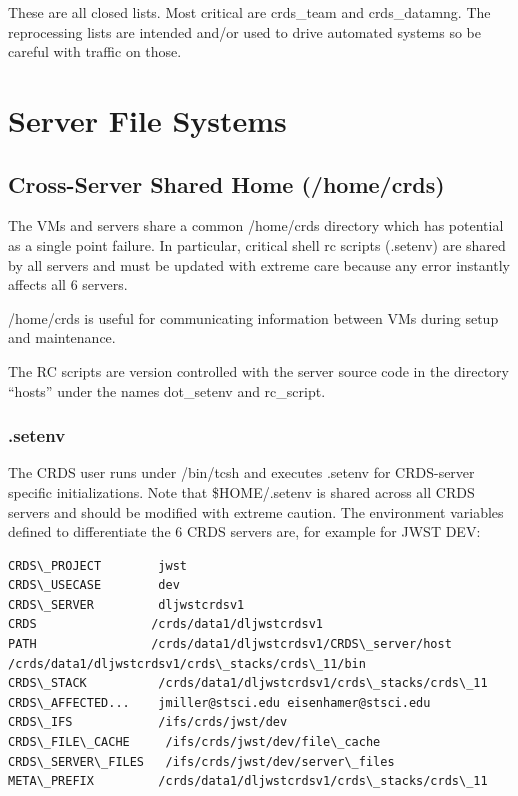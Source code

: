 \documentclass[letterpaper,10pt,english]{sphinxmanual}
\begin{document}
These are all closed lists.  Most critical are crds\_team and crds\_datamng.   The reprocessing lists are intended and/or used to drive
automated systems so be careful with traffic on those.


\chapter{Server File Systems}
\label{server_guide:server-file-systems}

\section{Cross-Server Shared Home (/home/crds)}
\label{server_guide:cross-server-shared-home-home-crds}
The VMs and servers share a common /home/crds directory which has potential as a single point failure.  In particular,
critical shell rc scripts (.setenv) are shared by all servers and must be updated with extreme care because
any error instantly affects all 6 servers.

/home/crds is useful for communicating information between VMs during setup and maintenance.

The RC scripts are version controlled with the server source code in the directory ``hosts'' under the names dot\_setenv
and rc\_script.


\subsection{.setenv}
\label{server_guide:setenv}
The CRDS user runs under /bin/tcsh and executes .setenv for CRDS-server specific initializations.   Note that
\$HOME/.setenv is shared across all CRDS servers and should be modified with extreme caution.   The environment
variables defined to differentiate the 6 CRDS servers are,  for example for JWST DEV:

\begin{Verbatim}[commandchars=\\\{\}]
CRDS\_PROJECT        jwst
CRDS\_USECASE        dev
CRDS\_SERVER         dljwstcrdsv1
CRDS                /crds/data1/dljwstcrdsv1
PATH                /crds/data1/dljwstcrdsv1/CRDS\_server/host   /crds/data1/dljwstcrdsv1/crds\_stacks/crds\_11/bin
CRDS\_STACK          /crds/data1/dljwstcrdsv1/crds\_stacks/crds\_11
CRDS\_AFFECTED...    jmiller@stsci.edu eisenhamer@stsci.edu
CRDS\_IFS            /ifs/crds/jwst/dev
CRDS\_FILE\_CACHE     /ifs/crds/jwst/dev/file\_cache
CRDS\_SERVER\_FILES   /ifs/crds/jwst/dev/server\_files
META\_PREFIX         /crds/data1/dljwstcrdsv1/crds\_stacks/crds\_11
\end{Verbatim}
\end{document}
